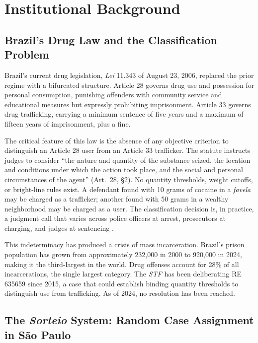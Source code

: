 \documentclass[12pt]{article}
\begin{document}
\section{Institutional Background}

\subsection{Brazil's Drug Law and the Classification Problem}

Brazil's current drug legislation, \textit{Lei} 11.343 of August 23, 2006, replaced the prior regime with a bifurcated structure. Article 28 governs drug use and possession for personal consumption, punishing offenders with community service and educational measures but expressly prohibiting imprisonment. Article 33 governs drug trafficking, carrying a minimum sentence of five years and a maximum of fifteen years of imprisonment, plus a fine.

The critical feature of this law is the absence of any objective criterion to distinguish an Article 28 user from an Article 33 trafficker. The statute instructs judges to consider ``the nature and quantity of the substance seized, the location and conditions under which the action took place, and the social and personal circumstances of the agent'' (Art.\ 28, \S2). No quantity thresholds, weight cutoffs, or bright-line rules exist. A defendant found with 10 grams of cocaine in a \textit{favela} may be charged as a trafficker; another found with 50 grams in a wealthy neighborhood may be charged as a user. The classification decision is, in practice, a judgment call that varies across police officers at arrest, prosecutors at charging, and judges at sentencing \citep{boiteux2006, jesusfilho2019}.

This indeterminacy has produced a crisis of mass incarceration. Brazil's prison population has grown from approximately 232,000 in 2000 to 920,000 in 2024, making it the third-largest in the world. Drug offenses account for 28\% of all incarcerations, the single largest category. The \textit{STF} has been deliberating RE 635659 since 2015, a case that could establish binding quantity thresholds to distinguish use from trafficking. As of 2024, no resolution has been reached.

\subsection{The \textit{Sorteio} System: Random Case Assignment in S\~ao Paulo}
\end{document}
